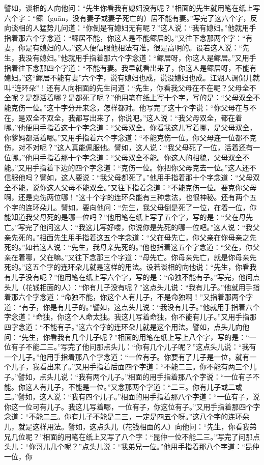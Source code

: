 \documentclass[12pt,UTF8]{ctexbook}
\begin{document}
譬如，谈相的人向他问：“先生你看我有媳妇没有呢？”相面的先生就用笔在纸上写六个字：“鳏（guān，没有妻子或妻子死亡的）居不能有妻。”写完了这六个字，反向谈相的人猛势儿问道：“你倒是有媳妇无有呢？”这人说：“我有媳妇。”他就用手指着那六个字念道：“鳏居不能，你这人是不能鳏居的。”又往下念那两个字：“有妻，你是有媳妇的人。”这人便信服他相法有准，很是高明的。设若这人说：“先生，我没有媳妇。”他就用手指着那六个字念道：“鳏居呀，你这人是鳏居。”又用手指着往下念那四个字道：“不能有妻。我早就看出来了，你这人是鳏居呀，不能有媳妇。”这“鳏居不能有妻”六个字，说有媳妇也成，说没媳妇也成。江湖人调侃儿就叫“连环朵”！还有人向相面的先生问道：“先生，你看我父母在不在呢？父母全不全呢？是都活着哪？是都死了呢？”他用笔在纸上写十个字，写的是：“父母双全不能克伤一位。”这十字分开来念，怎样都对。他写完了这十个字说：“你父母在与不在，是双全不双全，我都写出来了，你说吧。”这人说：“我父母双全，都在着哪。”他便用手指着这十个字念道：“父母双全。你看我这儿写着哪，是父母双全，你爹妈都活着哪。”又用手指着六个字念道：“不能克伤一位。你父母连一位都不克伤，对不对呢？”这人真能佩服他。譬如，这人说：“我父母死了一位，活着还有一位哪。”他用手指着那十个字念道：“父母双全不能。你这人的相貌，父母双全不能。”又用手指着下边的四个字念道：“克伤一位。你把你父母克去一位。”这人还不信服他吗？譬如，这人要说：“我父母都死了。”他用手指着那十个字念道：“父母双全不能，说你这人父母不能双全。”又往下指着念道：“不能克伤一位。要克你父母啊，还是克伤两位哪！”这十个字的连环朵能有三种念法，也很神秘。还有两个五个字的连环朵儿。譬如，要向他问：“先生，我父母倒是死了一位，在着一位，你能知道我父母死的是哪一位吗？”他用笔在纸上写了五个字，写的是：“父在母先亡。”写完了他问这人：“我这儿写好喽，你说你是先死的哪一位吧。”这人说：“我父亲先死的。”相面先生用手指着这五个字念道：“父在母先亡，你父亲在你母亲之先死的。”如若这人说：“先生，我母亲先死的。”他也指着这五个字念道：“父在，你父亲在着哪，父在嘛。”又往下念那三个字道：“母先亡。你母亲先亡，就是你母亲先死的。”这五个字的连环朵儿就是这样的用法。设若谈相的向他说：“先生，你看我有儿子没有呢？”他用笔在纸上写六个字，写的是：“命独不能有子。”写完，他问点头儿（花钱相面的人）：“你有儿子没有呢？”这点头儿说：“我有儿子。”他就用手指着那六个字念道：“命独不能，你这个人有儿子，不是命独啊！”又指着那两个字道：“有子，你是有儿子的。”譬如，这点头儿说：“我没有儿子。”他就用手指着六个字念道：“命独，你这个人命太独。我这儿写着命独，你不能有儿子。”又用手指那四字念道：“不能有子。”这六个字的连环朵儿就是这个用法。譬如，点头儿向他问：“先生，你看我有几个儿子呢？”相面的用笔在纸上写上八个字，写的是：“一位有子不能二三。”写完了他问那点头儿：“你有几个儿子呢？”这点头儿说：“我有一个儿子。”他用手指着那八个字念道：“一位有子。你要有了儿子是一位，就有一个儿子，我看出来了。”又用手指着后面四个字道：“不能二三。你不能有两三个儿子。”譬如，点头儿说：“我有两个儿子。”相面的用手指着那八个字说：“一位有子不能。你这人有儿子，不能是一位。”又念那两个字道：“二三。你有儿子或二或三。”譬如，这人说：“我有四个儿子。”相面的用手指着那八个字道：“一位有子，说你这一位可有儿子。我这儿写着哪，一位有子，你这位有子。”又用手指着那四个字念道：“不能二三。你有儿子不能是二三，一定是四五个呀。”这八个字的连环朵儿，就是这样用法。譬如，这点头儿（花钱相面的人）向他问：“先生，你看我弟兄几位呢？”相面的用笔在纸上又写了八个字：“昆仲一位不能二三。”写完了问那点头儿：“你哥儿几个呢？”点头儿说：“我弟兄一位。”他用手指着那八个字道：“昆仲一位，你
\end{document}
